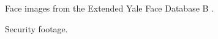 \documentclass[a4paper,11pt]{article}
\begin{document}
\begin{figure}[ht]
  \begin{center}
  \end{center}
  \caption{Face images from the Extended Yale Face Database B \cite{cryale}.}
  \label{fig:yale}
\end{figure}

\begin{figure}[ht]
  \begin{center}
  \end{center}
  \caption{Security footage.}
  \label{fig:security}
\end{figure}
\end{document}
